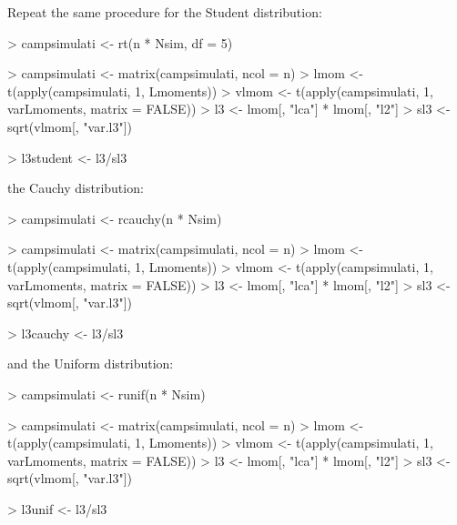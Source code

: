 \documentclass[a4paper]{article}
\begin{document}
Repeat the same procedure for the Student distribution:
\begin{Schunk}
\begin{Sinput}
> campsimulati <- rt(n * Nsim, df = 5)
\end{Sinput}
\end{Schunk}
\begin{Schunk}
\begin{Sinput}
> campsimulati <- matrix(campsimulati, ncol = n)
> lmom <- t(apply(campsimulati, 1, Lmoments))
> vlmom <- t(apply(campsimulati, 1, varLmoments, matrix = FALSE))
> l3 <- lmom[, "lca"] * lmom[, "l2"]
> sl3 <- sqrt(vlmom[, "var.l3"])
\end{Sinput}
\end{Schunk}
\begin{Schunk}
\begin{Sinput}
> l3student <- l3/sl3
\end{Sinput}
\end{Schunk}
the Cauchy distribution:
\begin{Schunk}
\begin{Sinput}
> campsimulati <- rcauchy(n * Nsim)
\end{Sinput}
\end{Schunk}
\begin{Schunk}
\begin{Sinput}
> campsimulati <- matrix(campsimulati, ncol = n)
> lmom <- t(apply(campsimulati, 1, Lmoments))
> vlmom <- t(apply(campsimulati, 1, varLmoments, matrix = FALSE))
> l3 <- lmom[, "lca"] * lmom[, "l2"]
> sl3 <- sqrt(vlmom[, "var.l3"])
\end{Sinput}
\end{Schunk}
\begin{Schunk}
\begin{Sinput}
> l3cauchy <- l3/sl3
\end{Sinput}
\end{Schunk}
and the Uniform distribution:
\begin{Schunk}
\begin{Sinput}
> campsimulati <- runif(n * Nsim)
\end{Sinput}
\end{Schunk}
\begin{Schunk}
\begin{Sinput}
> campsimulati <- matrix(campsimulati, ncol = n)
> lmom <- t(apply(campsimulati, 1, Lmoments))
> vlmom <- t(apply(campsimulati, 1, varLmoments, matrix = FALSE))
> l3 <- lmom[, "lca"] * lmom[, "l2"]
> sl3 <- sqrt(vlmom[, "var.l3"])
\end{Sinput}
\end{Schunk}
\begin{Schunk}
\begin{Sinput}
> l3unif <- l3/sl3
\end{Sinput}
\end{Schunk}
\end{document}

